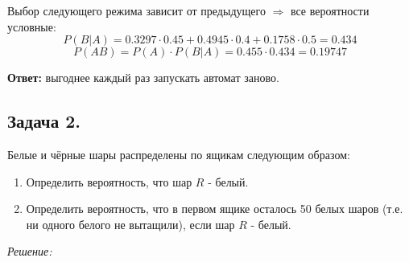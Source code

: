 \begin{enumerate}
	Выбор следующего режима зависит от предыдущего $\Rightarrow$ все вероятности условные:
	\[ P(B|A) = 0.3297 \cdot 0.45 + 0.4945 \cdot 0.4 + 0.1758 \cdot 0.5 = 0.434 \]
	\[ P(AB) = P(A) \cdot P(B|A) = 0.455 \cdot 0.434 = 0.19747 \]
\end{enumerate}

\textbf{Ответ:} выгоднее каждый раз запускать автомат заново.

\subsection*{Задача 2.}

Белые и чёрные шары распределены по ящикам следующим образом:

\begin{figure}[H]
\end{figure}

\begin{enumerate}
	\item Определить вероятность, что шар $R$ - белый.
	\item Определить вероятность, что в первом ящике осталось 50 белых шаров (т.е. ни одного белого не вытащили), если шар $R$ - белый.
\end{enumerate}

\textit{Решение:}

